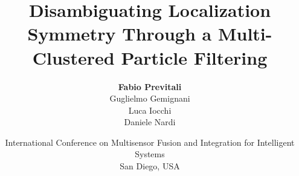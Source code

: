 \documentclass{beamer}
\title[Disambiguating Localization Symmetry Through a M-C PF]{\Large Disambiguating Localization Symmetry Through a Multi-Clustered Particle Filtering}
\subtitle{}
\author[Fabio Previtali]{\small\textbf{Fabio Previtali}\\Guglielmo Gemignani\\Luca Iocchi\\Daniele Nardi}
\date[September 16, 2015]{\scriptsize International Conference on Multisensor Fusion and Integration for Intelligent Systems\\San Diego, USA}
\begin{document}
\begin{frame}[plain]
	\titlepage
\end{frame}





\end{document}
